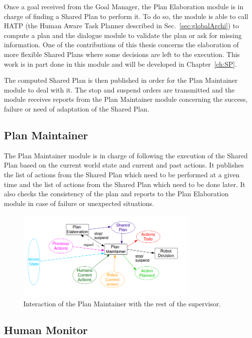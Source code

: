 \documentclass[english,a4paper,11pt,twoside]{StyleThese}
\begin{document}
Once a goal received from the Goal Manager, the Plan Elaboration module is in charge of finding a Shared Plan to perform it. To do so, the module is able to call HATP (the Human Aware Task Planner described in Sec.~\ref{sec:globalArchi}) to compute a plan and the dialogue module to validate the plan or ask for missing information. One of the contributions of this thesis concerns the elaboration of more flexible Shared Plans where some decisions are left to the execution. This work is in part done in this module and will be developed in Chapter~\ref{ch:SP}.

The computed Shared Plan is then published in order for the Plan Maintainer module to deal with it. The stop and suspend orders are transmitted and the module receives reports from the Plan Maintainer module concerning the success, failure or need of adaptation of the Shared Plan.

\subsection{Plan Maintainer}

The Plan Maintainer module is in charge of following the execution of the Shared Plan based on the current world state and current and past actions. It publishes the list of actions from the Shared Plan which need to be performed at a given time and the list of actions from the Shared Plan which need to be done later. It also checks the consistency of the plan and reports to the Plan Elaboration module in case of failure or unexpected situations.

\begin{figure}[!h]
	\centering
    \includegraphics[width=0.8\textwidth]{figs/Chapter2/PlanMaintainer.png}
    \caption{Interaction of the Plan Maintainer with the rest of the supervisor.}
    \label{fig:planMaintainer}
\end{figure}

\subsection{Human Monitor}
\end{document}
